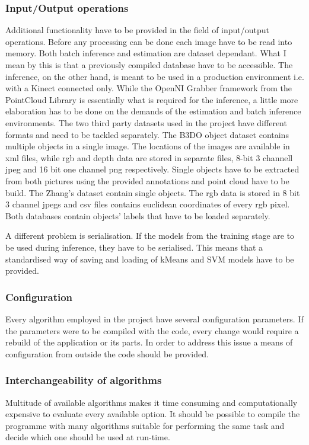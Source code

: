 		\subsubsection{Input/Output operations}	
		Additional functionality have to be provided in the field of input/output operations. Before any processing can be done each image have to be read into memory. Both batch inference and estimation are dataset dependant. What I mean by this is that a previously compiled database have to be accessible. The inference, on the other hand, is meant to be used in a production environment i.e. with a Kinect connected only. While the OpenNI Grabber framework from the PointCloud Library is essentially what is required for the inference, a little more elaboration has to be done on the demands of the estimation and batch inference environments. The two third party datasets used in the project have different formats and need to be tackled separately. The B3DO object dataset contains multiple objects in a single image. The locations of the images are available in xml files, while rgb and depth data are stored in separate files, 8-bit 3 channell jpeg and 16 bit one channel png respectively. Single objects have to be extracted from both pictures using the provided annotations and point cloud have to be build. The Zhang's dataset contain single objects. The rgb data is stored in 8 bit 3 channel jpegs and csv files contains euclidean coordinates of every rgb pixel. Both databases contain objects' labels that have to be loaded separately.
		
		A different problem is serialisation. If the models from the training stage are to be used during inference, they have to be serialised. This means that a standardised way of saving and loading of kMeans and SVM models have to be provided.  
	
		\subsubsection{Configuration}		
		Every algorithm employed in the project have several configuration parameters. If the parameters were to be compiled with the code, every change would require a rebuild of the application or its parts. In order to address this issue a means of configuration from outside the code should be provided. 
		
		\subsubsection{Interchangeability of algorithms}		
		Multitude of available algorithms makes it time consuming and computationally expensive to evaluate every available option. It should be possible to compile the programme with many algorithms suitable for performing the same task and decide which one should be used at run-time.
		
